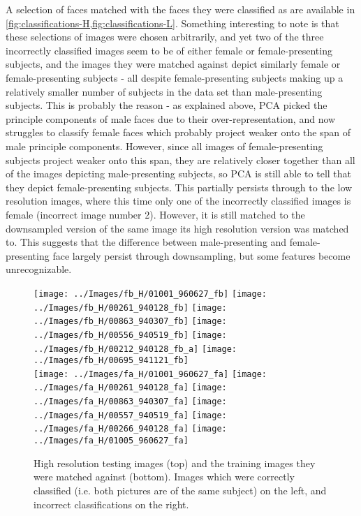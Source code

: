 \documentclass[headings=optiontoheadandtoc,listof=totoc,parskip=full]{scrartcl}
\begin{document}
A selection of faces matched with the faces they were classified as are available in \cref{fig:classifications-H,fig:classifications-L}. Something interesting to note is that these selections of images were chosen arbitrarily, and yet two of the three incorrectly classified images seem to be of either female or female-presenting subjects, and the images they were matched against depict similarly female or female-presenting subjects - all despite female-presenting subjects making up a relatively smaller number of subjects in the data set than male-presenting subjects. This is probably the reason - as explained above, PCA picked the principle components of male faces due to their over-representation, and now struggles to classify female faces which probably project weaker onto the span of male principle components. However, since all images of female-presenting subjects project weaker onto this span, they are relatively closer together than all of the images depicting male-presenting subjects, so PCA is still able to tell that they depict female-presenting subjects. This partially persists through to the low resolution images, where this time only one of the incorrectly classified images is female (incorrect image number 2). However, it is still matched to the downsampled version of the same image its high resolution version was matched to. This suggests that the difference between male-presenting and female-presenting face largely persist through downsampling, but some features become unrecognizable.

\begin{figure}[H]
	\centering
	\texttt{[image: ../Images/fb\_H/01001\_960627\_fb]}
	\texttt{[image: ../Images/fb\_H/00261\_940128\_fb]}
	\texttt{[image: ../Images/fb\_H/00863\_940307\_fb]}
	\quad
	\texttt{[image: ../Images/fb\_H/00556\_940519\_fb]}
	\texttt{[image: ../Images/fb\_H/00212\_940128\_fb\_a]}
	\texttt{[image: ../Images/fb\_H/00695\_941121\_fb]}\\
	\texttt{[image: ../Images/fa\_H/01001\_960627\_fa]}
	\texttt{[image: ../Images/fa\_H/00261\_940128\_fa]}
	\texttt{[image: ../Images/fa\_H/00863\_940307\_fa]}
	\quad
	\texttt{[image: ../Images/fa\_H/00557\_940519\_fa]}
	\texttt{[image: ../Images/fa\_H/00266\_940128\_fa]}
	\texttt{[image: ../Images/fa\_H/01005\_960627\_fa]}
	\caption{High resolution testing images (top) and the training images they were matched against (bottom). Images which were correctly classified (i.e. both pictures are of the same subject) on the left, and incorrect classifications on the right.}
	\label{fig:classifications-H}
\end{figure}
\end{document}
